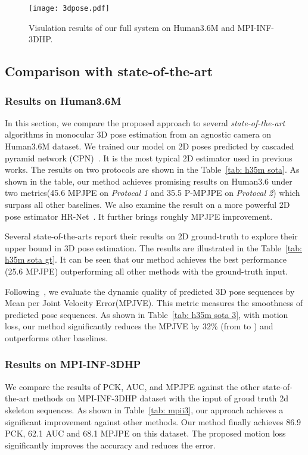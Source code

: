 \documentclass[runningheads]{llncs}
\begin{document}
\begin{figure*}[htb]
    \centering
    \texttt{[image: 3dpose.pdf]}
    \caption{\small
    Visulation results of our full system on Human3.6M and MPI-INF-3DHP.
}
    \label{fig:visulation}
\end{figure*}

\subsection{Comparison with state-of-the-art}

\subsubsection{Results on Human3.6M}
In this section, we compare the proposed approach to several \emph{state-of-the-art}
algorithms in monocular 3D pose estimation from an agnostic camera on Human3.6M dataset.
We trained our model on 2D poses predicted by cascaded pyramid network (CPN)~\cite{chen2018cascaded}.
It is the most typical 2D estimator used in previous works.
The results on two protocols are shown in the Table~\ref{tab: h35m sota}. As shown in the table,
our method achieves promising results on Human3.6
under two metrics(45.6 MPJPE on \textit{Protocal 1}
and 35.5 P-MPJPE on \textit{Protocal 2}) which surpass all other baselines.
We also examine the result on a more powerful 2D pose estimator HR-Net~\cite{Sun_2019_CVPR}.
It further brings roughly  MPJPE improvement.

Several state-of-the-arts report their results on 2D ground-truth to explore their upper bound in 3D pose estimation.
The results are illustrated in the Table~\ref{tab: h35m sota gt}.
It can be seen that our method achieves the best performance (25.6 MPJPE) outperforming all other methods with the ground-truth input.







Following~\cite{pavllo20193d}, we evaluate the dynamic quality of predicted 3D pose sequences by Mean per Joint Velocity Error(MPJVE).
This metric measures the smoothness of predicted pose sequences.
As shown in Table~\ref{tab: h35m sota 3},
with motion loss, our method significantly reduces the MPJVE by 32\% (from  to ) and outperforms other baselines.








\subsubsection{Results on MPI-INF-3DHP}
We compare the results of PCK, AUC, and MPJPE against the other state-of-the-art methods on MPI-INF-3DHP dataset with the input of groud truth 2d skeleton sequences.
As shown in Table~\ref{tab: mpii3}, our approach achieves a significant improvement against other methods.
Our method finally achieves 86.9 PCK, 62.1 AUC and 68.1 MPJPE on this dataset.
The proposed motion loss significantly improves the accuracy and reduces the error.
\end{document}
